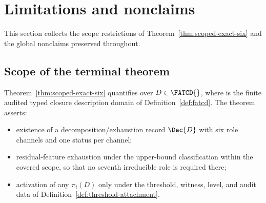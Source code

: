 \section{Limitations and nonclaims}\label{sec:limitations-nonclaims}

%
%

This section collects the scope restrictions of
Theorem~\ref{thm:scoped-exact-six} and the global nonclaims
preserved throughout.

\subsection{Scope of the terminal theorem}\label{subsec:terminal-scope}

Theorem~\ref{thm:scoped-exact-six} quantifies over \(D \in \FATCD{}\),
where \FATCD{} is the finite audited typed closure description domain
of Definition~\ref{def:fatcd}. The theorem asserts:
\begin{itemize}[topsep=2pt,itemsep=1pt]
  \item existence of a decomposition/exhaustion record \(\Dec{D}\)
    with six role channels and one status per channel;
  \item residual-feature exhaustion under the upper-bound
    classification within the covered scope, so that no seventh
    irreducible role is required there;
  \item activation of any \(\pi_i(D)\) only under the threshold,
    witness, level, and audit data of
    Definition~\ref{def:threshold-attachment}.
\end{itemize}

